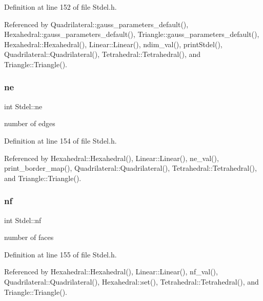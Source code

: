 Definition at line 152 of file Stdel.\+h.



Referenced by Quadrilateral\+::gauss\+\_\+parameters\+\_\+default(), Hexahedral\+::gauss\+\_\+parameters\+\_\+default(), Triangle\+::gauss\+\_\+parameters\+\_\+default(), Hexahedral\+::\+Hexahedral(), Linear\+::\+Linear(), ndim\+\_\+val(), print\+Stdel(), Quadrilateral\+::\+Quadrilateral(), Tetrahedral\+::\+Tetrahedral(), and Triangle\+::\+Triangle().

\mbox{\label{classStdel_aef3d1b34184b9fd03c0b655640c243b6}} 
\subsubsection{\texorpdfstring{ne}{ne}}
{\footnotesize\ttfamily int Stdel\+::ne\hspace{0.3cm}{\ttfamily [protected]}}



number of edges 



Definition at line 154 of file Stdel.\+h.



Referenced by Hexahedral\+::\+Hexahedral(), Linear\+::\+Linear(), ne\+\_\+val(), print\+\_\+border\+\_\+map(), Quadrilateral\+::\+Quadrilateral(), Tetrahedral\+::\+Tetrahedral(), and Triangle\+::\+Triangle().

\mbox{\label{classStdel_a61987080026986a40412a8937aad4b24}} 
\subsubsection{\texorpdfstring{nf}{nf}}
{\footnotesize\ttfamily int Stdel\+::nf\hspace{0.3cm}{\ttfamily [protected]}}



number of faces 



Definition at line 155 of file Stdel.\+h.



Referenced by Hexahedral\+::\+Hexahedral(), Linear\+::\+Linear(), nf\+\_\+val(), Quadrilateral\+::\+Quadrilateral(), Hexahedral\+::set(), Tetrahedral\+::\+Tetrahedral(), and Triangle\+::\+Triangle().

